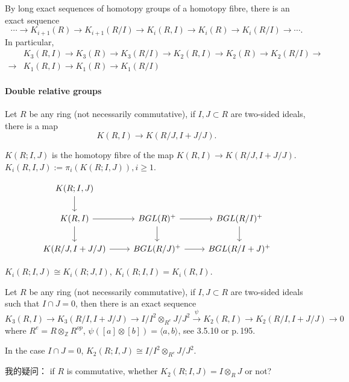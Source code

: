 By long exact sequences of homotopy groups of a homotopy fibre, there is an exact sequence
\[\cdots \longrightarrow K_{i+1}(R)\longrightarrow K_{i+1}(R/I) \longrightarrow K_i(R,I)\longrightarrow K_i(R)\longrightarrow K_i(R/I)\longrightarrow \cdots.\]
In particular,
\begin{align*}
&K_3(R,I)\longrightarrow K_3(R)\longrightarrow K_3(R/I) \longrightarrow K_2(R,I)\longrightarrow K_2(R)\longrightarrow K_2(R/I)\longrightarrow\\
\longrightarrow & K_1(R,I)\longrightarrow K_1(R)\longrightarrow K_1(R/I)
\end{align*}


\paragraph{Double relative groups} %
\label{par:double_relative_groups}

Let $R$ be any ring (not necessarily commutative), if $I,J\subset R$ are two-sided ideals, there is a map
\[K(R,I)\longrightarrow K(R/J,I+J/J).\]

\begin{definition}
	$K(R;I,J)$ is the homotopy fibre of the map $K(R,I)\longrightarrow K(R/J,I+J/J)$. $K_i(R,I,J):=\pi_i(K(R;I,J)), i\geq 1$.
\end{definition}
\[
\begin{tikzcd}
	K(R;I,J) \ar[d] & & \\
	K(R,I) \ar[r] \ar[d] & BGL(R)^+ \ar[r] \ar[d] &BGL(R/I)^+ \ar[d] \\
	K(R/J,I+J/J) \ar[r]  & BGL(R/J)^+ \ar[r]  &BGL(R/I+J)^+ 
\end{tikzcd}\]
\begin{remark}
	$K_i(R;I,J)\cong K_i(R;J,I)$, $K_i(R;I,I)=K_i(R,I)$.
\end{remark}


Let $R$ be any ring (not necessarily commutative), if $I,J\subset R$ are two-sided ideals such that $I\cap J =0$, then there is an exact sequence
\[K_3(R,I) \longrightarrow K_3(R/I,I+J/J)\longrightarrow I/I^2\otimes_{R^e}J/J^2\overset{\psi}{\longrightarrow}K_2(R,I)\longrightarrow K_2(R/I,I+J/J)\longrightarrow 0\]
where $R^e= R\otimes_{\mathbb{Z}}R^{op}$, $\psi([a]\otimes [b])=\langle a, b\rangle$, see \cite{weibel2013k} 3.5.10 or \cite{friedlander1981algebraic} p.\,195.

In the case $I\cap J =0$, $K_2(R;I,J)\cong I/I^2\otimes_{R^e}J/J^2$.

我的疑问： if $R$ is commutative, whether $K_2(R;I,J)=I\otimes_R J$ or not?

